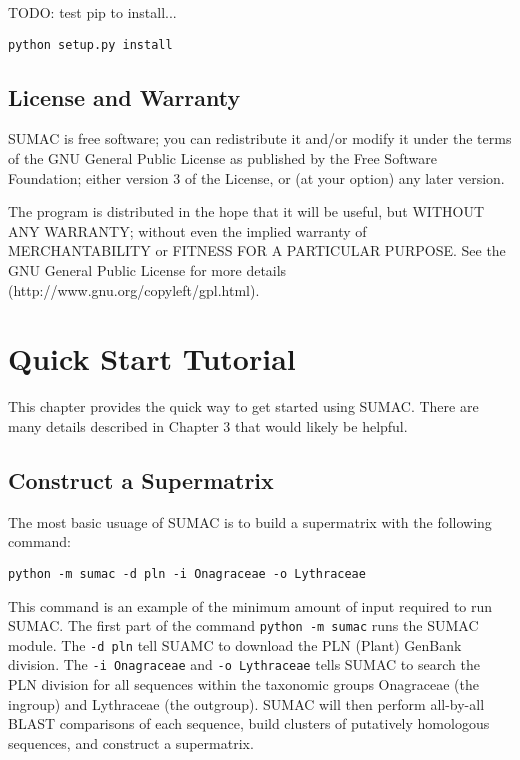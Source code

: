 \documentclass[10pt]{report}
\begin{document}
TODO: test pip to install...

\begin{verbatim}
python setup.py install
\end{verbatim}

\section{License and Warranty}
SUMAC is free software; you can redistribute it and/or modify it under the terms of the GNU General Public License as published by the Free Software Foundation; either version 3 of the License, or (at your option) any later version.

The program is distributed in the hope that it will be useful, but WITHOUT ANY WARRANTY; without even the implied warranty of MERCHANTABILITY or FITNESS FOR A PARTICULAR PURPOSE. See the GNU General Public License for more details \\ (http://www.gnu.org/copyleft/gpl.html).


\chapter{Quick Start Tutorial}

This chapter provides the quick way to get started using SUMAC. 
There are many details described in Chapter 3 that
would likely be helpful.

\section{Construct a Supermatrix}

The most basic usuage of SUMAC is to build a supermatrix with the following
command:

\begin{verbatim}
python -m sumac -d pln -i Onagraceae -o Lythraceae
\end{verbatim}

This command is an example of the minimum amount of input required
to run SUMAC. The first part of the command \texttt{python -m sumac}
runs the SUMAC module. The \texttt{-d pln}
tell SUAMC to download the PLN (Plant) GenBank division. The
\texttt{-i Onagraceae} and \texttt{-o Lythraceae}
tells SUMAC to search the PLN division for all sequences within
the taxonomic groups Onagraceae (the ingroup) and Lythraceae (the outgroup).
SUMAC will then perform all-by-all BLAST comparisons of each sequence, 
build clusters of putatively homologous sequences, and 
construct a supermatrix. 
\end{document}
